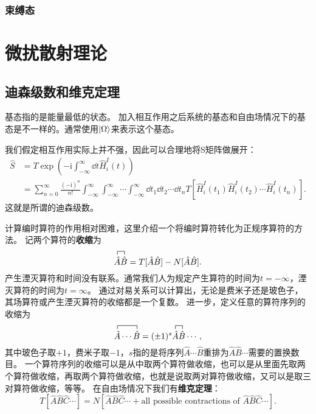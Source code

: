 \documentclass[hyperref, UTF8, a4paper]{ctexart}
\newcommand*{\ii}{\mathrm{i}}
\begin{document}

\subsubsection{束缚态}

\section{微扰散射理论}

\subsection{迪森级数和维克定理}

基态指的是能量最低的状态。
加入相互作用之后系统的基态和自由场情况下的基态是不一样的。通常使用$\ket{\Omega}$来表示这个基态。

我们假定相互作用实际上并不强，因此可以合理地将S矩阵做展开：
\begin{equation}
    \begin{aligned}
        \hat{S} &= T \exp \left( - \ii \int_{-\infty}^\infty \dd{t} \hat{H}_i^I(t) \right) \\
        &= \sum_{n=0}^\infty \frac{(-\ii)^n}{n!} \int_{-\infty}^\infty \int_{-\infty}^\infty \cdots \int_{-\infty}^\infty \dd{t_1} \dd{t_2} \cdots \dd{t_n} T [\hat{H}_i^I(t_1) \hat{H}_i^I(t_2) \cdots \hat{H}_i^I(t_n)].
    \end{aligned} 
    \label{eq:dyson-series}
\end{equation}
这就是所谓的迪森级数。

计算编时算符的作用相对困难，这里介绍一个将编时算符转化为正规序算符的方法。
记两个算符的\textbf{收缩}为
\begin{equation}
    {\contraction{}{\hat{A}}{}{\hat{B}} \hat{A}\hat{B}} = T[\hat{A} \hat{B}] - N[\hat{A} \hat{B}].
\end{equation}
产生湮灭算符和时间没有联系。通常我们人为规定产生算符的时间为$t=-\infty$，湮灭算符的时间为$t=\infty$。
通过对易关系可以计算出，无论是费米子还是玻色子，其场算符或产生湮灭算符的收缩都是一个复数。
进一步，定义任意的算符序列的收缩为
\begin{equation}
    {\contraction{}{\hat{A}}{\cdots}{\hat{B}} \hat{A} \cdots \hat{B}} = (\pm 1)^s {\contraction{}{\hat{A}}{}{\hat{B}} \hat{A}\hat{B}} \cdots,
\end{equation}
其中玻色子取$+1$，费米子取$-1$，$s$指的是将序列$\hat{A} \cdots \hat{B}$重排为$\hat{A}\hat{B} \cdots$需要的置换数目。
一个算符序列的收缩可以是从中取两个算符做收缩，也可以是从里面先取两个算符做收缩，再取两个算符做收缩，也就是说取两对算符做收缩，又可以是取三对算符做收缩，等等。
在自由场情况下我们有\textbf{维克定理}：
\begin{equation}
    T[\hat{A} \hat{B} \hat{C} \cdots] = N[\hat{A} \hat{B} \hat{C} \cdots + \text{all possible contractions of } \hat{A} \hat{B} \hat{C} \cdots].
\end{equation}
\end{document}
